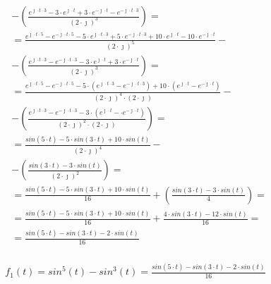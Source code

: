 \begin{task}
\begin{align*}
&-\left(\frac{e^{\jmath \cdot t \cdot 3} - 3 \cdot e^{\jmath \cdot t} + 3 \cdot e^{-\jmath \cdot t} - e^{-\jmath \cdot t \cdot 3}}{\left(2 \cdot \jmath\right)^3}\right)=\\
&=\frac{e^{\jmath \cdot t \cdot 5} - e^{-\jmath \cdot t \cdot 5} - 5 \cdot e^{\jmath \cdot t \cdot 3} + 5 \cdot e^{-\jmath \cdot t \cdot 3} + 10 \cdot e^{\jmath \cdot t} - 10 \cdot e^{-\jmath \cdot t}}{\left(2 \cdot \jmath\right)^5} - \\
&-\left(\frac{e^{\jmath \cdot t \cdot 3} - e^{-\jmath \cdot t \cdot 3} - 3 \cdot e^{\jmath \cdot t} + 3 \cdot e^{-\jmath \cdot t}}{\left(2 \cdot \jmath\right)^3}\right)=\\
&=\frac{e^{\jmath \cdot t \cdot 5} - e^{-\jmath \cdot t \cdot 5} - 5 \cdot (e^{\jmath \cdot t \cdot 3} - e^{-\jmath \cdot t \cdot 3}) + 10 \cdot (e^{\jmath \cdot t} - e^{-\jmath \cdot t})}{\left(2 \cdot \jmath\right)^4 \cdot (2 \cdot \jmath)} - \\
&-\left(\frac{e^{\jmath \cdot t \cdot 3} - e^{-\jmath \cdot t \cdot 3} - 3 \cdot (e^{\jmath \cdot t} - \cdot e^{-\jmath \cdot t})}{\left(2 \cdot \jmath\right)^2 \cdot (2 \cdot \jmath)}\right)=\\
&=\frac{sin(5 \cdot t) - 5 \cdot sin(3 \cdot t) + 10 \cdot sin(t)}{\left(2 \cdot \jmath\right)^4} - \\
&-\left(\frac{sin(3 \cdot t) - 3 \cdot sin(t)}{\left(2 \cdot \jmath\right)^2}\right)=\\
&=\frac{sin(5 \cdot t) - 5 \cdot sin(3 \cdot t) + 10 \cdot sin(t)}{16} +\left(\frac{sin(3 \cdot t) - 3 \cdot sin(t)}{4}\right)=\\
&=\frac{sin(5 \cdot t) - 5 \cdot sin(3 \cdot t) + 10 \cdot sin(t)}{16} +\frac{4 \cdot sin(3 \cdot t) - 12 \cdot sin(t)}{16}=\\
&=\frac{sin(5 \cdot t) - sin(3 \cdot t) -2 \cdot sin(t)}{16}\\
\end{align*}

\begin{align*}
f_{1}(t)=sin^5(t)-sin^3(t) = \frac{sin(5 \cdot t) - sin(3 \cdot t) -2 \cdot sin(t)}{16}
\end{align*}



\end{task}
